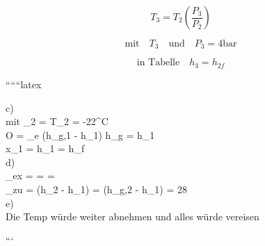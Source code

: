 \begin{equation*}
    T_3 = T_2 \left( \frac{P_3}{P_2} \right)
\end{equation*}

\begin{equation*}
    \text{mit} \quad T_3 \quad \text{und} \quad P_3 = 4 \text{bar}
\end{equation*}

\begin{equation*}
    \text{in Tabelle} \quad h_3 = h_{2f}
\end{equation*}

``````latex


c) \\
mit \quad {}_2 =  \quad {} \quad T_2 = -22^\circ C \\
O = _e (h_{g,1} - h_1) \quad \Rightarrow \quad h_{g} = h_1 \\

x_1 =  \quad {} \quad h_1 = h_f \\

d) \\
\varepsilon_{ex} =  =  =  \\

_{zu} =  (h_2 - h_1) =  (h_{g,2} - h_1) \quad {} \quad {} = 28  \\

e) \\
Die Temp würde weiter abnehmen und alles würde vereisen

```